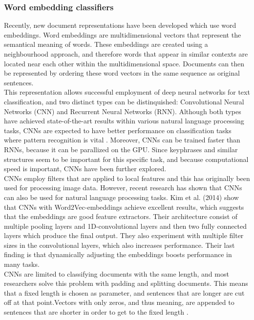 \subsubsection{Word embedding classifiers}
Recently, new document representations have been developed which use word embeddings. Word embeddings are multidimensional vectors that represent the semantical meaning of words. These embeddings are created using a neighbourhood approach, and therefore words that appear in similar contexts are located near each other within the multidimensional space. \cite{mikolov2013efficient} Documents can then be represented by ordering these word vectors in the same sequence as original sentences.\\
This representation allows successful employment of deep neural networks for text classification, and two distinct types can be distinquished: Convolutional Neural Networks (CNN) and Recurrent Neural Networks (RNN). Although both types have achieved state-of-the-art results within various natural language processing tasks, CNNs are expected to have better performance on classification tasks where pattern recognition is vital \cite{yin2017comparative}. Moreover, CNNs can be trained faster than RNNs, because it can be parallized on the GPU. Since keyphrases and similar structures seem to be important for this specific task, and because computational speed is important, CNNs have been further explored.\\ 
CNNs employ filters that are applied to local features and this has originally been used for processing image data. However, recent research has shown that CNNs can also be used for natural language processing tasks. Kim et al. (2014) show that CNNs with Word2Vec-embeddings achieve excellent results, which suggests that the embeddings are good feature extractors. Their architecture consist of multiple pooling layers and 1D-convolutional layers and then two fully connected layers which produce the final output. They also experiment with multiple filter sizes in the convolutional layers, which also increases performance. Their last finding is that dynamically adjusting the embeddings boosts performance in many tasks. \\
CNNs are limited to classifying documents with the same length, and most researchers solve this problem with padding and splitting documents. This means that a fixed length is chosen as parameter, and sentences that are longer are cut off at that point.Vectors with only zeros, and thus meaning, are appended to sentences that are shorter in order to get to the fixed length \cite{kim2014convolutional}  \cite{zhang2015sensitivity}. \\
